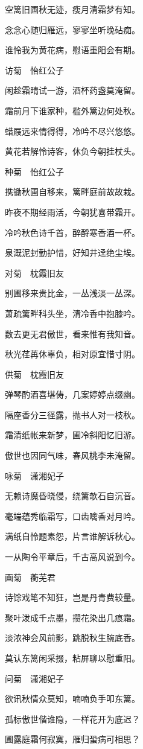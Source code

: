 空篱旧圃秋无迹，瘦月清霜梦有知。

念念心随归雁远，寥寥坐听晚砧痴。

谁怜我为黄花病，慰语重阳会有期。

访菊　怡红公子

闲趁霜晴试一游，酒杯药盏莫淹留。

霜前月下谁家种，槛外篱边何处秋。

蜡屐远来情得得，冷吟不尽兴悠悠。

黄花若解怜诗客，休负今朝挂杖头。

种菊　怡红公子

携锄秋圃自移来，篱畔庭前故故栽。

昨夜不期经雨活，今朝犹喜带霜开。

冷吟秋色诗千首，醉酹寒香酒一杯。

泉溉泥封勤护惜，好知井迳绝尘埃。

对菊　枕霞旧友

别圃移来贵比金，一丛浅淡一丛深。

萧疏篱畔科头坐，清冷香中抱膝吟。

数去更无君傲世，看来惟有我知音。

秋光荏苒休辜负，相对原宜惜寸阴。

供菊　枕霞旧友

弹琴酌酒喜堪俦，几案婷婷点缀幽。

隔座香分三径露，抛书人对一枝秋。

霜清纸帐来新梦，圃冷斜阳忆旧游。

傲世也因同气味，春风桃李未淹留。

咏菊　潇湘妃子

无赖诗魔昏晓侵，绕篱欹石自沉音。

毫端蕴秀临霜写，口齿噙香对月吟。

满纸自怜题素怨，片言谁解诉秋心。

一从陶令平章后，千古高风说到今。

画菊　蘅芜君

诗馀戏笔不知狂，岂是丹青费较量。

聚叶泼成千点墨，攒花染出几痕霜。

淡浓神会风前影，跳脱秋生腕底香。

莫认东篱闲采掇，粘屏聊以慰重阳。

问菊　潇湘妃子

欲讯秋情众莫知，喃喃负手叩东篱。

孤标傲世偕谁隐，一样花开为底迟？

圃露庭霜何寂寞，雁归蛩病可相思？

